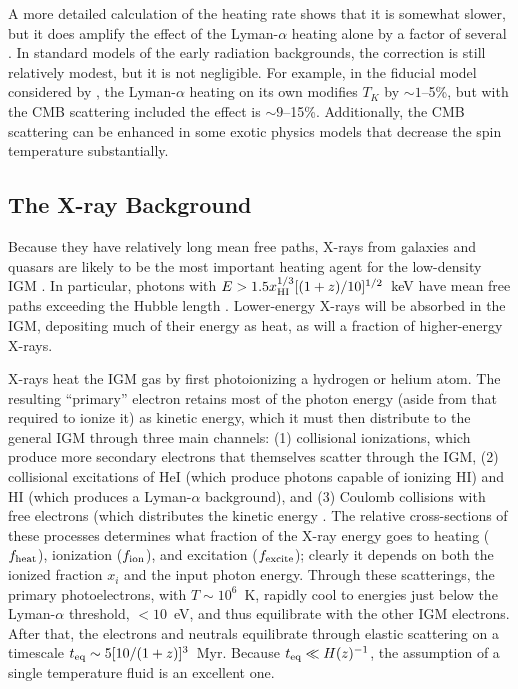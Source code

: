 A more detailed calculation of the heating rate shows that it is somewhat slower, but it does amplify the effect of the Lyman-$\alpha$ heating alone by a factor of several \cite{venumadhav18}. In standard models of the early radiation backgrounds, the correction is still relatively modest, but it is not negligible. For example, in the fiducial model considered by \cite{venumadhav18}, the Lyman-$\alpha$ heating on its own modifies $T_K$ by $\sim 1$--5\%, but with the CMB scattering included the effect is $\sim 9$--15\%. Additionally, the CMB scattering can be enhanced in some exotic physics models that decrease the spin temperature substantially.

\subsection{The X-ray Background} 

Because they have relatively long mean free paths, X-rays from galaxies and quasars are likely to be the most important heating agent for the low-density IGM  \cite{madau97}.  In particular, photons with $E>1.5 x_{\rm HI}^{1/3} [(1+z)/10]^{1/2}$~keV have mean free paths exceeding the Hubble length \cite{oh01}.  Lower-energy X-rays will be absorbed in the IGM, depositing much of their energy as heat, as will a fraction of higher-energy X-rays.

X-rays heat the IGM gas by first photoionizing a hydrogen or helium atom.  The resulting ``primary'' electron retains most of the photon energy (aside from that required to ionize it) as kinetic energy, which it must then distribute to the general IGM through three main channels: (1) collisional ionizations, which produce more secondary electrons that themselves scatter through the IGM, (2) collisional excitations of HeI (which produce photons capable of ionizing HI) and HI (which produces a Lyman-$\alpha$ background), and (3) Coulomb collisions with free electrons (which distributes the kinetic energy .  The relative cross-sections of these processes determines what fraction of the X-ray energy goes to heating ($f_{\rm heat}$), ionization ($f_{\rm ion}$), and excitation ($f_{\rm excite}$); clearly it depends on both the ionized fraction $x_i$ and the input photon energy.  Through these scatterings, the primary photoelectrons, with $T \sim 10^6$~K, rapidly cool to energies just below the Lyman-$\alpha$ threshold, $<10$~eV, and thus equilibrate with the other IGM electrons.  After that, the electrons and neutrals equilibrate through elastic scattering on a timescale $t_{\rm eq} \sim 5 [10/(1+z)]^3$~Myr.  Because $t_{\rm eq} \ll H(z)^{-1}$, the assumption of a single temperature fluid is an excellent one.

